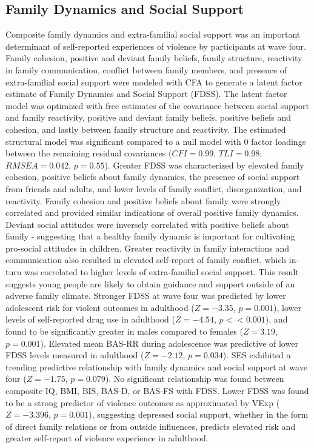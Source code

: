 \documentclass[utf8]{article}
\begin{document}
\subsection{Family Dynamics and Social Support} Composite family dynamics and extra-familial social support was an important determinant of self-reported experiences of violence by participants at wave four. Family cohesion, positive and deviant family beliefs, family structure, reactivity in family communication, conflict between family members, and presence of extra-familial social support were modeled with CFA to generate a latent factor estimate of Family Dynamics and Social Support (FDSS). The latent factor model was optimized with free estimates of the covariance between social support and family reactivity, positive and deviant family beliefs, positive beliefs and cohesion, and lastly between family structure and reactivity. The estimated structural model was significant compared to a null model with $0$ factor loadings between the remaining residual covariances ($CFI=0.99$, $TLI=0.98$; $RMSEA=0.042$, $p=0.55$). Greater FDSS was characterized by elevated family cohesion, positive beliefs about family dynamics, the presence of social support from friends and adults, and lower levels of family conflict, disorganization, and reactivity. Family cohesion and positive beliefs about family were strongly correlated and provided similar indications of overall positive family dynamics. Deviant social attitudes were inversely correlated with positive beliefs about family  - suggesting that a healthy family dynamic is important for cultivating pro-social attitudes in children. Greater reactivity in family interactions and communication also resulted in elevated self-report of family conflict, which in-turn was correlated to higher levels of extra-familial social support. This result suggests young people are likely to obtain guidance and support outside of an adverse family climate. Stronger FDSS at wave four was predicted by lower adolescent risk for violent outcomes in adulthood ($Z=-3.35$, $p=0.001$), lower levels of self-reported drug use in adulthood ($Z=-4.54$, $p<<0.001$), and found to be significantly greater in males compared to females ($Z=3.19$, $p=0.001$).  Elevated mean BAS-RR during adolescence was predictive of lower FDSS levels measured in adulthood ($Z=-2.12$, $p=0.034$). SES exhibited a trending predictive relationship with family dynamics and social support at wave four ($Z=-1.75$, $p=0.079$). No significant relationship was found between composite IQ, BMI, BIS, BAS-D, or BAS-FS with FDSS. Lower FDSS was found to be a strong predictor of violence outcomes as approximated by VExp ($Z=-3.396$, $p=0.001$), suggesting depressed social support, whether in the form of direct family relations or from outside influences, predicts elevated risk and greater self-report of violence experience in adulthood.
\end{document}
